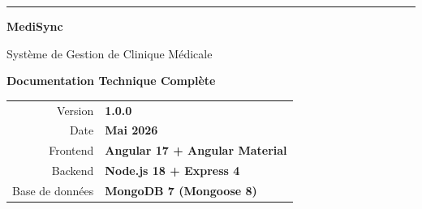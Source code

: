 \documentclass[12pt,a4paper]{report}
\begin{document}
\begin{titlepage}
  \pagecolor{white}
  \color{DarkSlate}

  \vspace*{1.5cm}

  \noindent\textcolor{MedTeal}{\rule{\textwidth}{4pt}}

  \vspace{0.5cm}

  \begin{center}

    \vspace{0.7cm}
    {\fontsize{36}{42}\selectfont\bfseries\textcolor{MedTeal}{MediSync}}

    \vspace{0.2cm}
    {\large\textcolor{CommentGray}{Système de Gestion de Clinique Médicale}}

    \vspace{1.2cm}

    \noindent\colorbox{MedTealLight}{%
      \parbox{0.85\textwidth}{%
        \vspace{0.5cm}
        \centering
        {\LARGE\bfseries\textcolor{MedTealDark}{Documentation Technique Complète}}
        \vspace{0.5cm}
      }%
    }

    \vspace{1.5cm}

    \begin{tabular}{@{} r @{\quad} l @{}}
      \textcolor{CommentGray}{Version} &
        \textcolor{DarkSlate}{\textbf{1.0.0}} \\[6pt]
      \textcolor{CommentGray}{Date} &
        \textcolor{DarkSlate}{\textbf{Mai 2026}} \\[6pt]
      \textcolor{CommentGray}{Frontend} &
        \textcolor{DarkSlate}{\textbf{Angular 17 + Angular Material}} \\[6pt]
      \textcolor{CommentGray}{Backend} &
        \textcolor{DarkSlate}{\textbf{Node.js 18 + Express 4}} \\[6pt]
      \textcolor{CommentGray}{Base de données} &
        \textcolor{DarkSlate}{\textbf{MongoDB 7 (Mongoose 8)}} \\[6pt]
    \end{tabular}
  \end{center}


\end{titlepage}
\end{document}
